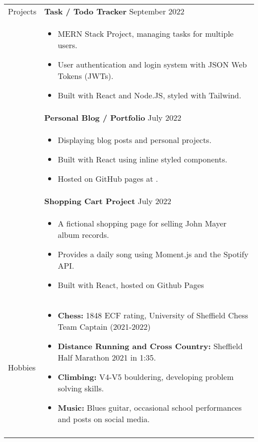 \documentclass[11pt]{article}
\begin{document}
\begin{minipage}[t][0pt]{\linewidth} %
    \begin{tabular}[t]{p{2cm} p{14cm}}
    	{Projects} &

		\textbf{Task / Todo Tracker}  \hfill September 2022 \\ &
		\begin{itemize}
			\renewcommand{\labelitemi}{$\diamond$}
			\item MERN Stack Project, managing tasks for multiple users.
			\item User authentication and login system with JSON Web Tokens (JWTs).
			\item Built with React and Node.JS, styled with Tailwind.
		\end{itemize} \\ &

		\textbf{Personal Blog / Portfolio}  \hfill July 2022 \\ &
		\begin{itemize}
			\renewcommand{\labelitemi}{$\diamond$}
			\item Displaying blog posts and personal projects.
			\item Built with React using inline styled components. 
			\item Hosted on GitHub pages at \href{jluong23.github.io/blog}{\color{Blue}{jluong23.github.io/blog}}.
		\end{itemize} \\ &

		\textbf{Shopping Cart Project}  \hfill July 2022 \\ &
		\begin{itemize}
			\renewcommand{\labelitemi}{$\diamond$}
			\item A fictional shopping page for selling John Mayer album records. 
			\item Provides a daily song using Moment.js and the Spotify API.
			\item Built with React, hosted on Github Pages
		\end{itemize} \\

		
	    {Hobbies} &
        \begin{itemize}
            \renewcommand{\labelitemi}{$\diamond$}
            \item \textbf{Chess:} 1848 ECF rating, University of Sheffield Chess Team Captain (2021-2022)
            \item \textbf{Distance Running and Cross Country:} Sheffield Half Marathon 2021 in 1:35.
            \item \textbf{Climbing:} V4-V5 bouldering, developing problem solving skills.
            \item \textbf{Music:} Blues guitar, occasional school performances and posts on social media.
        \end{itemize} \\
		\\


\end{tabular}
\end{minipage}
\end{document}
